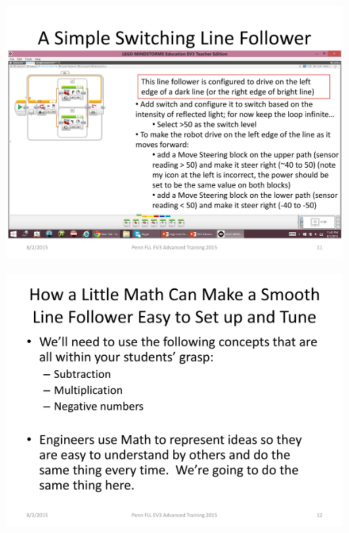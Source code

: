 \documentclass[11pt]{beamer}
\begin{document}
\begin{frame}
\begin{figure}
\includegraphics[scale=0.4]{ev3advanced2015/file-page11}
\end{figure}

\end{frame}
\begin{frame}
\begin{figure}
\includegraphics[scale=0.4]{ev3advanced2015/file-page12}
\end{figure}
\end{frame}
\end{document}
